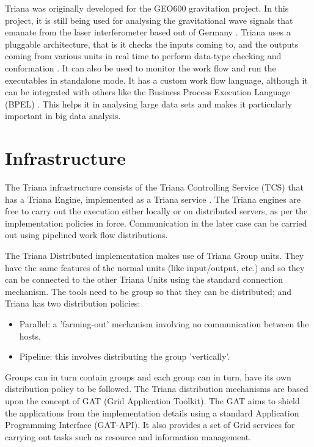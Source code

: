 \documentclass[9pt,twocolumn,twoside]{styles/osajnl}
\begin{document}
Triana was originally developed for the GEO600
gravitation project.  In this project, it is still being used for
analysing the gravitational wave signals that emanate from the laser
interferometer based out of Germany \cite{TrianaGEO600}.  Triana uses 
a pluggable architecture, that is it checks the inputs
coming to, and the outputs coming from various units in real time to
perform data-type checking and conformation \cite{TrianaDocumentation2}.  
It can also be used to monitor the work flow and run the executables in standalone mode.
  It has a custom work flow language, although it can
be integrated with others like the Business Process Execution Language
(BPEL) \cite{RMBDP-Book}.  This helps it in analysing large data sets and makes it
particularly important in big data analysis.

\section{Infrastructure}

The Triana infrastructure consists of the
Triana Controlling Service (TCS) that has a Triana Engine, implemented
as a Triana service \cite{TrianaDocumentation2}.  The Triana engines 
are free to carry out the execution either locally or on distributed servers,
as per the implementation policies in force.  Communication in the later case can
be carried out using pipelined work flow distributions.

The Triana Distributed implementation makes use of Triana Group units.
They have the same features of the normal units (like input/output,
etc.) and so they can be connected to the other Triana Units using the
standard connection mechanism.  The tools need to be group so that
they can be distributed; and Triana has two distribution policies:

\begin{itemize}

\item Parallel: a 'farming-out' mechanism involving no communication
  between the hosts.
\item Pipeline: this involves distributing the group 'vertically'.

\end{itemize}

Groups can in turn contain groups and each group can in turn, have its
own distribution policy to be followed.  The Triana distribution
mechanisms are based upon the concept of GAT (Grid Application
Toolkit).  The GAT aims to shield the applications from the
implementation details using a standard Application Programming
Interface (GAT-API).  It also provides a set of Grid services for
carrying out tasks such as resource and information management.
\end{document}
